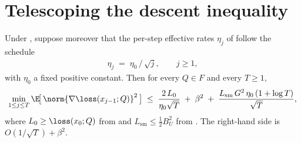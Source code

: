 \section{Telescoping the descent inequality}
\label{sec:telescoping}

\begin{lemma}\label{lem:telescoping}
Under
,
suppose moreover that the per-step effective rates $\eta_j$ of
 follow the schedule
\begin{align}\label{eq:step_size_schedule}
   \eta_j \;=\; \eta_0 \,/\, \sqrt{j},
   \qquad j \ge 1,
\end{align}
with $\eta_0$ a fixed positive constant. Then for every $Q \in F$ and
every $T \ge 1$,
\begin{align}\label{eq:telescoping_rate}
   \min_{1 \le j \le T} \E\!\bigl[\, \norm{\nabla \loss(x_{j-1}; Q)}^2 \,\bigr]
   \;\le\;
   \frac{2\, L_0}{\eta_0 \sqrt T}
   \;+\; \beta^2
   \;+\; \frac{L_{\mathrm{sm}}\, G^2\, \eta_0\, (1 + \log T)}{\sqrt T},
\end{align}
where $L_0 \ge \loss(x_0; Q)$ from  and
$L_{\mathrm{sm}} \le \tfrac{1}{2} B_U^2$ from .
The right-hand side is $O(1/\sqrt T) + \beta^2$.
\end{lemma}

